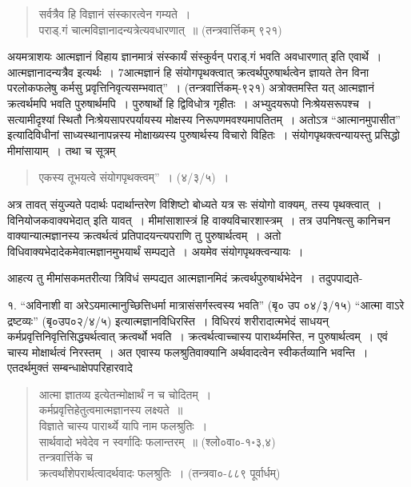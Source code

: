 {\begin{verse}
सर्वत्रैव हि विज्ञानं संस्कारत्वेन गम्यते~। \\
पराड्.गं चात्मविज्ञानादन्यत्रेत्यवधारणात्~॥ (तन्त्रवार्त्तिकम् ९२१)
\end{verse}

अयमत्राशयः  आत्मज्ञानं विहाय ज्ञानमात्रं संस्कार्यं संस्कुर्वन् पराड्.गं भवति अवधारणात् इति एवार्थे~। आत्मज्ञानादन्यत्रैव इत्यर्थः~। 7आत्मज्ञानं हि संयोगपृथक्त्वात् क्रत्वर्थपुरुषार्थत्वेन ज्ञायते तेन विना परलोकफलेषु कर्मसु प्रवृत्तिनिवृत्यसम्भवात्”~। (तन्त्रवार्त्तिकम्-९२१) अत्रोक्तमस्ति यत् आत्मज्ञानं क्रत्वर्थमपि भवति पुरुषार्थमपि~। पुरुषार्थो हि द्विविधोत्र गृहीतः~। अभ्युदयरूपो निःश्रेयसरूपश्च~। सत्यामीदृश्यां स्थितौ निःश्रेयसापरपर्यायस्य मोक्षस्य निरूपणमवश्यमापतितम्~। अतोऽत्र “आत्मानमुपासीत” इत्यादिविधीनां साध्यस्थानापन्नस्य मोक्षाख्यस्य पुरुषार्थस्य विचारो विहितः~। संयोगपृथक्त्वन्यायस्तु प्रसिद्धो मीमांसायाम्~। तथा च सूत्रम्  

\begin{verse}
एकस्य तूभयत्वे संयोगपृथक्त्वम्”~। (४/३/५)~। 
\end{verse}
अत्र तावत् संयुज्यते पदार्थः पदार्थान्तरेण विशिष्टो बोध्यते यत्र सः संयोगो वाक्यम्, तस्य पृथक्त्वात्~। विनियोजकवाक्यभेदात् इति यावत्~। मीमांसाशास्त्रं हि वाक्यविचारशास्त्रम्~। तत्र उपनिषत्सु कानिचन वाक्यान्यात्मज्ञानस्य क्रत्वर्थत्वं प्रतिपादयन्त्यपराणि तु पुरुषार्थत्वम्~। अतो विधिवाक्यभेदादेकमेवात्मज्ञानमुभयार्थं सम्पद्यते~। अयमेव संयोगपृथक्त्वन्यायः~। 

आहत्य तु मीमांसकमतरीत्या त्रिविधं सम्पद्यत आत्मज्ञानमिदं क्रत्वर्थपुरुषार्थभेदेन~। तदुपपाद्यते-

१. “अविनाशी वा अरेऽयमात्मानुच्छित्तिधर्मा मात्रासंसर्गस्त्वस्य भवति” (बृ० उप ०४/३/१५) “आत्मा वाऽरे द्रष्टव्यः” (बृ०उप०२/४/५) इत्यात्मज्ञानविधिरस्ति~। विधिरयं शरीरादात्मभेदं साधयन् कर्मप्रवृत्तिनिवृत्तिसिद्ध्यर्थत्वात् क्रत्वर्थो भवति~। क्रत्वर्थत्वाच्चास्य पारार्थ्यमस्ति, न पुरुषार्थत्वम्~। एवं चास्य मोक्षार्थत्वं निरस्तम्~। अत एवास्य फलश्रुतिवाक्यानि अर्थवादत्वेन स्वीकर्तव्यानि भवन्ति~। एतदर्थमुक्तं सम्बन्धाक्षेपपरिहारवादे

\begin{verse}
आत्मा ज्ञातव्य इत्येतन्मोक्षार्थं न च चोदितम्~। \\
कर्मप्रवृत्तिहेतुत्वमात्मज्ञानस्य लक्ष्यते~॥ \\
विज्ञाते चास्य पारार्थ्ये यापि नाम फलश्रुतिः~। \\
सार्थवादो भवेदेव न स्वर्गादिः फलान्तरम्~॥ (श्लो०वा०-१॰३,४)\\
तन्त्रवार्त्तिके च\\
क्रत्वर्थांशेपरार्थत्वादर्थवादः फलश्रुतिः~। (तन्त्रवा०-८८९ पूर्वार्धम्)
\end{verse}

}
